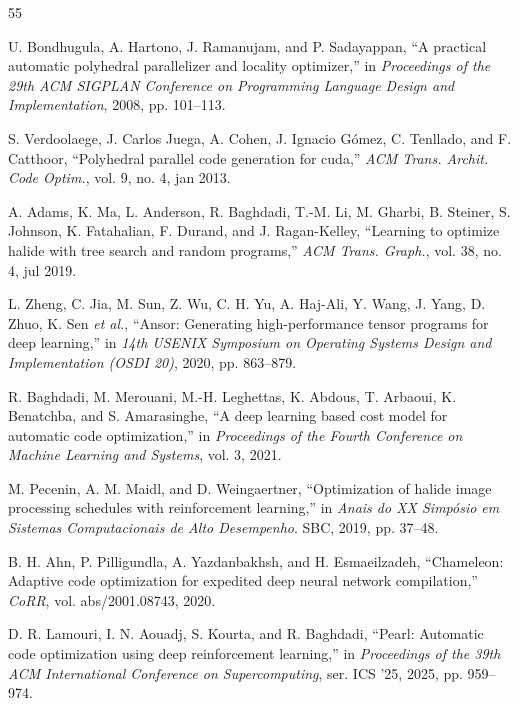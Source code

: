 \documentclass[10pt,twocolumn]{article}
\begin{document}
\begin{thebibliography}{55}

 U. Bondhugula, A. Hartono, J. Ramanujam, and P. Sadayappan, ``A practical automatic polyhedral parallelizer and locality optimizer,'' in \emph{Proceedings of the 29th ACM SIGPLAN Conference on Programming Language Design and Implementation}, 2008, pp. 101--113.

 S. Verdoolaege, J. Carlos Juega, A. Cohen, J. Ignacio G\'omez, C. Tenllado, and F. Catthoor, ``Polyhedral parallel code generation for cuda,'' \emph{ACM Trans. Archit. Code Optim.}, vol. 9, no. 4, jan 2013.

 A. Adams, K. Ma, L. Anderson, R. Baghdadi, T.-M. Li, M. Gharbi, B. Steiner, S. Johnson, K. Fatahalian, F. Durand, and J. Ragan-Kelley, ``Learning to optimize halide with tree search and random programs,'' \emph{ACM Trans. Graph.}, vol. 38, no. 4, jul 2019.

 L. Zheng, C. Jia, M. Sun, Z. Wu, C. H. Yu, A. Haj-Ali, Y. Wang, J. Yang, D. Zhuo, K. Sen \emph{et al.}, ``Ansor: Generating high-performance tensor programs for deep learning,'' in \emph{14th USENIX Symposium on Operating Systems Design and Implementation (OSDI 20)}, 2020, pp. 863--879.

 R. Baghdadi, M. Merouani, M.-H. Leghettas, K. Abdous, T. Arbaoui, K. Benatchba, and S. Amarasinghe, ``A deep learning based cost model for automatic code optimization,'' in \emph{Proceedings of the Fourth Conference on Machine Learning and Systems}, vol. 3, 2021.

 M. Pecenin, A. M. Maidl, and D. Weingaertner, ``Optimization of halide image processing schedules with reinforcement learning,'' in \emph{Anais do XX Simp\'osio em Sistemas Computacionais de Alto Desempenho}. SBC, 2019, pp. 37--48.

 B. H. Ahn, P. Pilligundla, A. Yazdanbakhsh, and H. Esmaeilzadeh, ``Chameleon: Adaptive code optimization for expedited deep neural network compilation,'' \emph{CoRR}, vol. abs/2001.08743, 2020.

 D. R. Lamouri, I. N. Aouadj, S. Kourta, and R. Baghdadi, ``Pearl: Automatic code optimization using deep reinforcement learning,'' in \emph{Proceedings of the 39th ACM International Conference on Supercomputing}, ser. ICS '25, 2025, pp. 959--974.


\end{thebibliography}
\end{document}
